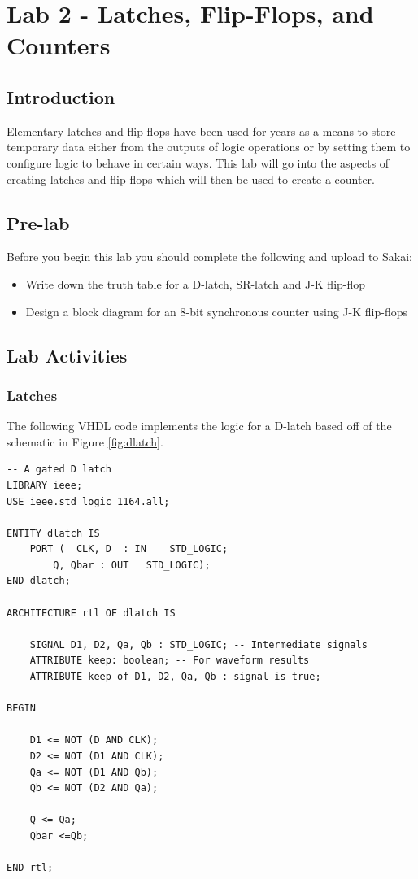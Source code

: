 \section{Lab 2 - Latches, Flip-Flops, and Counters}

\subsection{Introduction}
Elementary latches and flip-flops have been used for years as a means to store temporary data either from the outputs of logic operations or by setting them to configure logic to behave in certain ways. This lab will go into the aspects of creating latches and flip-flops which will then be used to create a counter. 

\subsection{Pre-lab}
Before you begin this lab you should complete the following and upload to Sakai:

\begin{itemize}
	\item Write down the truth table for a D-latch, SR-latch and J-K flip-flop
	\item Design a block diagram for an 8-bit synchronous counter using J-K flip-flops
\end{itemize} 

\subsection{Lab Activities}

\subsubsection{Latches}
The following VHDL code implements the logic for a D-latch based off of the schematic in Figure \ref{fig:dlatch}. 

\begin{lstlisting}
-- A gated D latch
LIBRARY ieee;
USE ieee.std_logic_1164.all;

ENTITY dlatch IS
	PORT (	CLK, D	: IN	STD_LOGIC;
		Q, Qbar	: OUT	STD_LOGIC);
END dlatch;

ARCHITECTURE rtl OF dlatch IS

	SIGNAL D1, D2, Qa, Qb : STD_LOGIC; -- Intermediate signals
	ATTRIBUTE keep: boolean; -- For waveform results
	ATTRIBUTE keep of D1, D2, Qa, Qb : signal is true;
	
BEGIN
	
	D1 <= NOT (D AND CLK);
	D2 <= NOT (D1 AND CLK);
	Qa <= NOT (D1 AND Qb);
	Qb <= NOT (D2 AND Qa);

	Q <= Qa;
	Qbar <=Qb;
	
END rtl;
\end{lstlisting}


